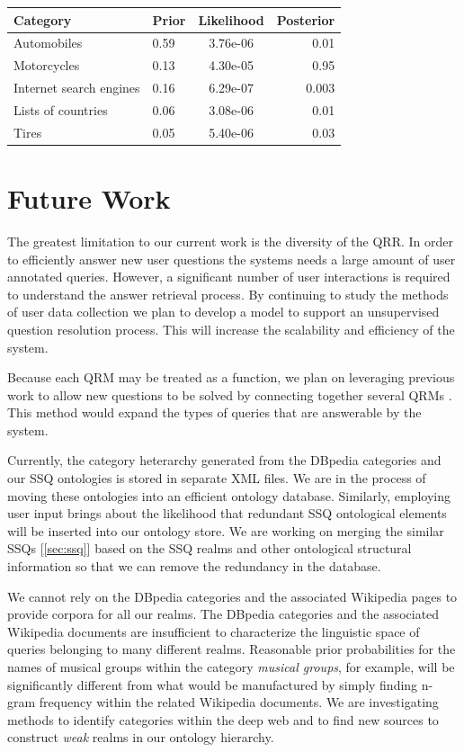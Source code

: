 \begin{center}
  \begin{tabular}{ | l | l | c | r | }
    \hline
    Category & Prior & Likelihood & Posterior \\ \hline
    Automobiles & 0.59 & 3.76e-06 & 0.01 \\ 
    Motorcycles & 0.13 & 4.30e-05 & 0.95 \\
    Internet search engines & 0.16 & 6.29e-07 & 0.003 \\ 
    Lists of countries & 0.06 & 3.08e-06 & 0.01 \\
    Tires & 0.05 & 5.40e-06 & 0.03 \\
    \hline

  \end{tabular}
   
\end{center}


\section{Future Work}

The greatest limitation to our current work is the diversity of the
QRR.  In order to efficiently answer new user questions the systems
needs a large amount of user annotated queries.  However, a
significant number of user interactions is required to understand the
answer retrieval process.  By continuing to study the methods of user
data collection we plan to develop a model to support an unsupervised
question resolution process.  This will increase the scalability and
efficiency of the system.

Because each QRM may be treated as a function, we plan on leveraging
previous work to allow new questions to be solved by connecting
together several QRMs \cite{morpheus1, transformscout}.  This method
would expand the types of queries that are answerable by the system.

Currently, the category heterarchy generated from the DBpedia
categories and our SSQ ontologies is stored in separate XML files. We
are in the process of moving these ontologies into an efficient
ontology database. Similarly, employing user input brings about the
likelihood that redundant SSQ ontological elements will be inserted
into our ontology store. We are working on merging the similar SSQs
[\ref{sec:ssq}] based on the SSQ realms and other ontological
structural information so that we can remove the redundancy in the
database.

We cannot rely on the DBpedia categories and the associated Wikipedia
pages to provide corpora for all our realms.  The DBpedia categories
and the associated Wikipedia documents are insufficient to
characterize the linguistic space of queries belonging to many
different realms.  Reasonable prior probabilities for the names of
musical groups within the category \emph{musical groups}, for example,
will be significantly different from what would be manufactured by
simply finding n-gram frequency within the related Wikipedia
documents. We are investigating methods to identify categories within
the deep web and to find new sources to construct \textit{weak} realms
in our ontology hierarchy.


